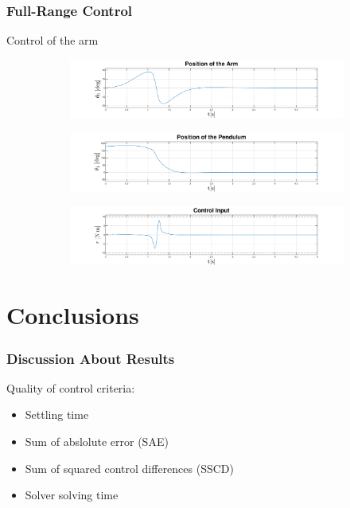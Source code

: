 \documentclass[]{beamer}
\begin{document}
\begin{frame}
	\frametitle{Full-Range Control}	
	Control of the arm
	\begin{figure}[H]
		\centering
		\begin{subfigure}
			\centering
			\includegraphics[scale=0.25]{images/Oswing/arm.pdf}  
		\end{subfigure}
		\begin{subfigure}
			\centering
			\includegraphics[scale=0.25]{images/Oswing/pend.pdf}  
		\end{subfigure}
		\begin{subfigure}
			\centering
			\includegraphics[scale=0.25]{images/Oswing/control.pdf} 
		\end{subfigure}
	\end{figure}
\end{frame}

\section{Conclusions}

\begin{frame}
	\frametitle{Discussion About Results}
	Quality of control criteria:
	\begin{itemize}
		\item Settling time\\
		\item Sum of abslolute error (SAE)\\
		\item Sum of squared control differences (SSCD)\\
		\item Solver solving time\\
	\end{itemize}
\end{frame}
\end{document}
